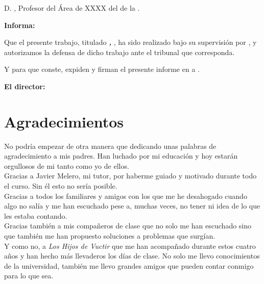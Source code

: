 D. \textbf{\myProf}, Profesor del Área de XXXX del \myDepartment de la \myUni.

\vspace{0.5cm}

\textbf{Informa:}

\vspace{0.5cm}

Que el presente trabajo, titulado \textit{\textbf{\myTitle, \mySubtitle}}, ha sido realizado bajo su supervisión por \textbf{\myName}, y autorizamos la defensa de dicho trabajo ante el tribunal que corresponda.

\vspace{0.5cm}

Y para que conste, expiden y firman el presente informe en \myLocation a \myTime.

\vspace{1cm}

\textbf{El director:}

\vspace{5cm}

\noindent \textbf{\myProf}

\chapter*{Agradecimientos}
\thispagestyle{empty}

\vspace{1cm}

No podría empezar de otra manera que dedicando unas palabras de agradecimiento a mis padres. Han luchado por mi educación y hoy estarán orgullosos de mi tanto como yo de ellos.
\\

Gracias a Javier Melero, mi tutor, por haberme guiado y motivado durante todo el curso. Sin él esto no sería posible.
\\

Gracias a todos los familiares y amigos con los que me he desahogado cuando algo no salía y me han escuchado pese a, muchas veces, no tener ni idea de lo que les estaba contando.
\\

Gracias también a mis compañeros de clase que no solo me han escuchado sino que también me han propuesto soluciones a problemas que surgían.
\\

Y como no, a \textit{Los Hijos de Vuctir} que me han acompañado durante estos cuatro años y han hecho más llevaderos los días de clase. No solo me llevo conocimientos de la universidad, también me llevo grandes amigos que pueden contar conmigo para lo que sea.